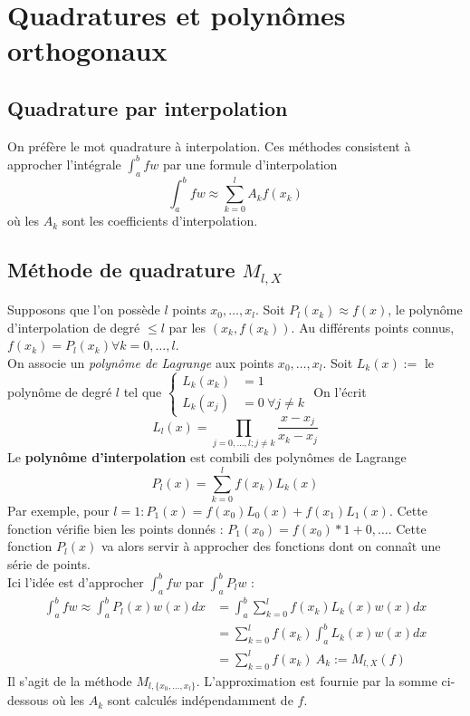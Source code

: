 \setcounter{section}{18}
\section{Quadratures et polynômes orthogonaux}
	\setcounter{subsection}{6}
	\subsection{Quadrature par interpolation}
	On préfère le mot quadrature à interpolation. Ces méthodes consistent à 
	approcher l'intégrale $\int_a^b fw$ par une formule d'interpolation
	\begin{equation}
	\int_a^b fw \approx \sum_{k=0}^l A_k f(x_k)
	\end{equation}
	où les $A_k$ sont les coefficients d'interpolation.
	\subsection{Méthode de quadrature $M_{l,X}$}
	Supposons que l'on possède $l$ points $x_0,\dots, x_l$. Soit $P_l(x_k) \approx 
	f(x)$, le polynôme d'interpolation de degré $\leq l$ par les $(x_k, f(x_k))$. 
	Au différents points connus, $f(x_k) = P_l(x_k) \forall k =0,\dots,l$.\\
	On associe un \textit{polynôme de Lagrange} aux points $x_0,\dots,x_l$. Soit 
	$L_k(x) :=$ le polynôme de degré $l$ tel que $\left\{\begin{array}{ll}
	L_k(x_k) &= 1\\
	L_k(x_j) &= 0\ \forall j \neq k
	\end{array}\right.$ On l'écrit 
	\begin{equation}
	L_l(x) = \prod_{j=0,\dots,l;j\neq k} \frac{x-x_j}{x_k-x_j}
	\end{equation}
	Le \textbf{polynôme d'interpolation} est combili des polynômes de Lagrange 
	\begin{equation}
	P_l(x) = \sum_{k=0}^l f(x_k)L_k(x)
	\end{equation}
	Par exemple, pour $l=1 : P_1(x) = f(x_0)L_0(x) + f(x_1)L_1(x)$. Cette fonction 
	vérifie bien les points donnés : $P_1(x_0) = f(x_0)*1 + 0, \dots$. Cette fonction 
	$P_l(x)$ va alors servir à approcher des fonctions dont on connaît une série 
	de points.\\
	Ici l'idée est d'approcher $\int_a^b fw$ par $\int_a^b P_lw$ :
	\begin{equation}
	\begin{array}{ll}
	\int_a^b fw \approx \int_a^b P_l(x)w(x) dx &= \int_a^b \sum_{k=0}^l f(x_k)
	L_k(x)w(x)dx\\
	 &= \sum_{k=0}^l f(x_k)\int_a^b L_k(x)w(x) dx\\
	 &= \sum_{k=0}^l f(x_k)\ A_k := M_{l,X}(f)
	\end{array}
	\end{equation}
	Il s'agit de la méthode $M_{l,\{x_0,\dots,x_l\}}$. L'approximation est fournie 
	par la somme ci-dessous où les $A_k$ sont calculés indépendamment de $f$.\\
	
